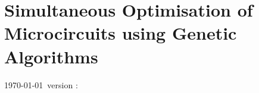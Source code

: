\documentclass[11pt,a4paper,twoside,openright]{book}
\begin{document}
		{%
			\singlespacing%
			\tableofcontents%
			\listoffigures%
                        \printglossaries
		   \clearpage%
		}%


\setcounter{chapter}{4}
\chapter[GAChapter]{Simultaneous Optimisation of Microcircuits using Genetic Algorithms}\label{sec:GAChapter}


\vspace{5cm}
{\centering \today\, version :}


\newpage

{\small{}}
\newpage

\newpage

\newpage

\newpage





 

\newpage
\listoftodos
\end{document}
